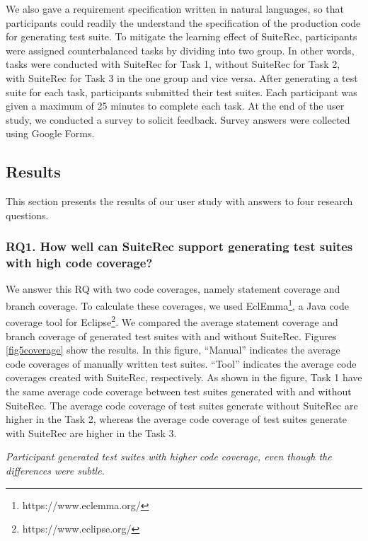 \documentclass[conference]{IEEEtran}
\begin{document}
We also gave a requirement specification written in natural languages, so that participants could readily the understand the specification of the production code for generating test suite. To mitigate the learning effect of \textsf{SuiteRec}, participants were assigned counterbalanced tasks by dividing into two group. In other words, tasks were conducted with \textsf{SuiteRec} for Task 1, without \textsf{SuiteRec} for Task 2, with \textsf{SuiteRec} for Task 3 in the one group and vice versa. After generating a test suite for each task, participants submitted their test suites. Each participant was given a maximum of 25 minutes to complete each task. At the end of the user study, we conducted a survey to solicit feedback. Survey answers were collected using Google Forms. 



\subsection{Results}
This section presents the results of our user study with answers to four research questions.

\subsubsection{RQ1. How well can \textsf{SuiteRec} support generating test suites with high code coverage?}
We answer this RQ with two code coverages, namely statement coverage and branch coverage. To calculate these coverages, we used \textsf{EclEmma}\footnote{https://www.eclemma.org/}, a Java code coverage tool for \textsf{Eclipse}\footnote{https://www.eclipse.org/}.
We compared the average statement coverage and branch coverage of generated test suites with and without \textsf{SuiteRec}. 
Figures \ref{fig5coverage} show the results. In this figure, ``Manual'' indicates the average code coverages of manually written test suites. ``Tool'' indicates the average code coverages created with \textsf{SuiteRec}, respectively. As shown in the figure, Task 1 have the same average code coverage between test suites generated with and without \textsf{SuiteRec}. The average code coverage of test suites generate without \textsf{SuiteRec} are higher in the Task 2, whereas the average code coverage of test suites generate with \textsf{SuiteRec} are higher in the Task 3.
\begin{breakbox}
\textit{Participant generated test suites with higher code coverage, even though the differences were subtle.}
\end{breakbox}
\end{document}
